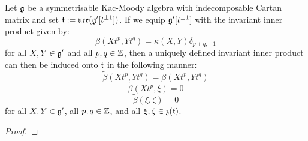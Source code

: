             \begin{proposition} \label{prop: invariant_inner_product_on_double_toroidal_lie_algebras}
                Let $\mathfrak{g}$ be a symmetrisable Kac-Moody algebra with indecomposable Cartan matrix and set $\mathfrak{t} := \mathfrak{uce}( \mathfrak{g}'[t^{\pm 1}] )$. If we equip $\mathfrak{g}'[t^{\pm 1}]$ with the invariant inner product given by:
                    $$\beta(X t^p, Y t^q) = \kappa(X, Y) \delta_{p + q, -1}$$
                for all $X, Y \in \mathfrak{g}'$ and all $p, q \in \mathbb{Z}$, then a uniquely defined invariant inner product can then be induced onto $\mathfrak{t}$ in the following manner:
                    $$\tilde{\beta}(X t^p, Y t^q) = \beta(X t^p, Y t^q)$$
                    $$\tilde{\beta}(X t^p, \xi) = 0$$
                    $$\tilde{\beta}(\xi, \zeta) = 0$$
                for all $X, Y \in \mathfrak{g}'$, all $p, q \in \mathbb{Z}$, and all $\xi, \zeta \in \mathfrak{z}(\mathfrak{t})$.
            \end{proposition}
                \begin{proof}
                    
                \end{proof}
    
    \printbibliography

